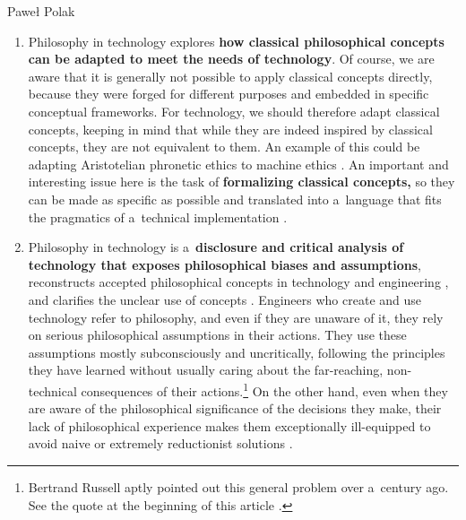 \begin{artengenv}{Paweł Polak}
\begin{enumerate}[label=(\Roman*)]
\item Philosophy in technology explores \textbf{how classical philosophical concepts can be adapted to meet the needs of technology}. Of course, we are aware that it is generally not possible to apply classical concepts directly, because they were forged for different purposes and embedded in specific conceptual frameworks. For technology, we should therefore adapt classical concepts, keeping in mind that while they are indeed inspired by classical concepts, they are not equivalent to them. An example of this could be adapting Aristotelian phronetic ethics to machine ethics 
\parencites[][]{polak_phronetic_2020}[][]{polak_ethics_2020}. %
 An important and interesting issue here is the task of \textbf{formalizing classical concepts,} so they can be made as specific as possible and translated into a~language that fits the pragmatics of a~technical implementation 
\parencites[e.g.,][]{darowski_relacja_2006}[][]{tavani_ethics_2013}.%




\item Philosophy in technology is a~\textbf{disclosure and critical analysis of technology that exposes philosophical biases and assumptions}, reconstructs accepted philosophical concepts in technology and engineering 
\parencite[e.g.,][]{smith_promise_2019}, %
 and clarifies the unclear use of concepts 
\parencite[e.g.,][]{cervantes_artificial_2019}. %
 Engineers who create and use technology refer to philosophy, and even if they are unaware of it, they rely on serious philosophical assumptions in their actions. They use these assumptions mostly subconsciously and uncritically, following the principles they have learned without usually caring about the far-reaching, non-technical consequences of their actions.\footnote{Bertrand Russell aptly pointed out this general problem over a~century ago. See the quote at the beginning of this article 
\parencite[][pp.243–244]{russell_problems_1912}.%
} On the other hand, even when they are aware of the philosophical significance of the decisions they make, their lack of philosophical experience makes them exceptionally ill-equipped to avoid naive or extremely reductionist solutions 
\parencite[cf.][]{gordon_building_2020}.%





\end{enumerate}
\end{artengenv}
